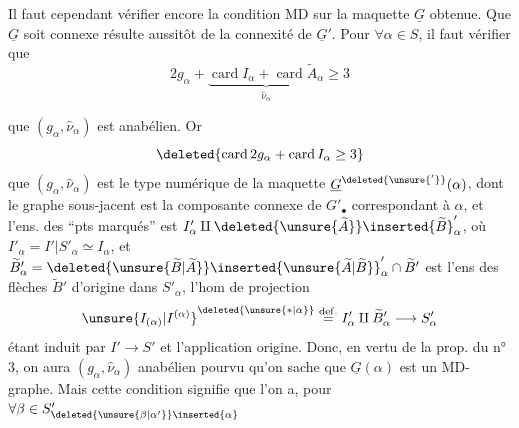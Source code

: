 Il faut cependant vérifier encore la condition MD sur la maquette $\underline G$ obtenue. Que $\underline G$ soit connexe résulte aussitôt de la connexité de $\underline G'$. Pour $\forall\alpha\in S$, il faut vérifier que
\[
2g_\alpha+\underbrace{\operatorname{card}I_\alpha+\operatorname{card}\widetilde A_\alpha}_{\widehat\nu_\alpha}\geq3
\]

 que $(g_\alpha,\widehat\nu_\alpha)$ est anabélien. Or
\[
\deleted{\operatorname{card}2g_\alpha+\operatorname{card}I_\alpha\geq3}
\]
 que $(g_\alpha,\widehat\nu_\alpha)$ est le type numérique de la maquette $\underline G^{\deleted{\unsure{'}}}(\alpha)$, dont le graphe sous-jacent est la composante connexe de $G'_\bullet$ correspondant à $\alpha$, et l'ens. des ``pts marqués'' est $I'_\alpha\amalg\deleted{\unsure{\widetilde A}}\inserted{\widetilde B}'_\alpha$,  où $I'_\alpha=I'|S'_\alpha\simeq I_\alpha$, et $\widetilde B'_\alpha=\deleted{\unsure{\widetilde B|\widetilde A}}\inserted{\unsure{\widetilde A|\widetilde B}}'_\alpha\cap\widetilde B'$ est l'ens des flèches  $\widetilde B'$ d'origine dans $S'_\alpha$, l'hom de projection
\[
\unsure{I_{(\alpha)}|I^{(\alpha)}}^{\deleted{\unsure{\ast|\alpha}}}\overset{\mathrm{def.}}{=}I'_\alpha\amalg\widetilde B'_\alpha\longrightarrow S'_\alpha
\]
étant induit par $I'\to S'$ et l'application origine. Donc, en vertu de la prop. du n° 3, on aura $(g_\alpha,\widehat\nu_\alpha)$ anabélien pourvu qu'on sache que $\underline G(\alpha)$ est un MD-graphe. Mais cette condition signifie que l'on a, pour $\forall\beta\in S'_{\deleted{\unsure{\beta|\alpha'}}\inserted{\alpha}}$
